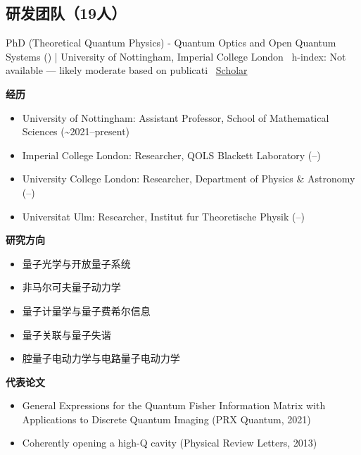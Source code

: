 \subsection{研发团队（19人）}
\vspace{4pt}
\par{\footnotesize\color{graytext}PhD (Theoretical Quantum Physics) - Quantum Optics and Open Quantum Systems () | University of Nottingham, Imperial College London \textbar\  h-index: Not available — likely moderate based on publicati \textbar\  \href{Not found in public search}{Scholar}}
\par{\footnotesize\color{mainred}\textbf{经历}}
\begin{itemize}[leftmargin=1.2em,itemsep=0pt,topsep=0pt]
\item {\footnotesize University of Nottingham: Assistant Professor, School of Mathematical Sciences (\textasciitilde{}2021–present)}
\item {\footnotesize Imperial College London: Researcher, QOLS Blackett Laboratory (–)}
\item {\footnotesize University College London: Researcher, Department of Physics \& Astronomy (–)}
\item {\footnotesize Universitat Ulm: Researcher, Institut fur Theoretische Physik (–)}
\end{itemize}
\par{\footnotesize\color{mainred}\textbf{研究方向}}
\begin{itemize}[leftmargin=1.2em,itemsep=0pt,topsep=0pt]
\item {\footnotesize 量子光学与开放量子系统}
\item {\footnotesize 非马尔可夫量子动力学}
\item {\footnotesize 量子计量学与量子费希尔信息}
\item {\footnotesize 量子关联与量子失谐}
\item {\footnotesize 腔量子电动力学与电路量子电动力学}
\end{itemize}
\par{\footnotesize\color{mainred}\textbf{代表论文}}
\begin{itemize}[leftmargin=1.2em,itemsep=0pt,topsep=0pt]
\item {\footnotesize General Expressions for the Quantum Fisher Information Matrix with Applications to Discrete Quantum Imaging (PRX Quantum, 2021)}
\item {\footnotesize Coherently opening a high-Q cavity (Physical Review Letters, 2013)}
\end{itemize}
